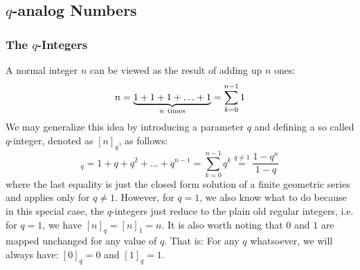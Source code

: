 




\subsection{$q$-analog Numbers}

\subsubsection{The $q$-Integers}
A normal integer $n$ can be viewed as the result of adding up $n$ ones:
\begin{equation}
n = \underbrace{1 + 1 + 1 + \ldots + 1}_{n\rm\ times} 
  = \sum_{k=0}^{n-1} 1
\end{equation}
We may generalize this idea by introducing a parameter $q$ and defining a so called $q$-integer, denoted as $[n]_q$, as follows:
\begin{equation}
[n]_q = 1 + q + q^2 + \ldots + q^{n-1} 
      = \sum_{k=0}^{n-1} q^k
      \overset{q \neq 1}{=} \frac{1 - q^n}{1 - q}
\end{equation}
where the last equality is just the closed form solution of a finite geometric series and applies only for $q \neq 1$. However, for $q = 1$, we also know what to do because in this special case, the $q$-integers just reduce to the plain old regular integers, i.e. for $q=1$, we have $[n]_q = [n]_1 = n$. It is also worth noting that $0$ and $1$ are mapped unchanged for any value of $q$. That is: For any $q$ whatsoever, we will always have: $[0]_q = 0$ and $[1]_q = 1$.






